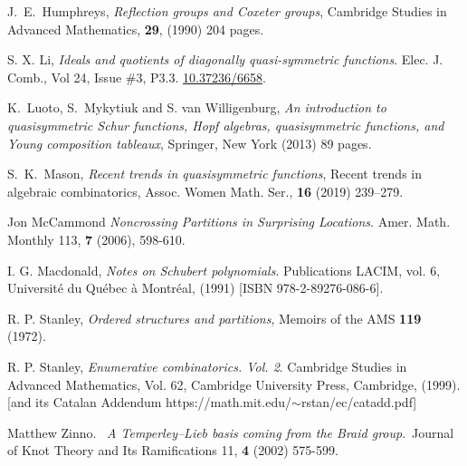 \documentclass[12pt]{amsart}
\theoremstyle{definition}
\theoremstyle{remark}
\numberwithin{equation}{section}
\begin{document}
\begin{thebibliography}{99}
 J.~E.~Humphreys,   \textit{Reflection groups and {C}oxeter groups},
 {Cambridge Studies in Advanced Mathematics},
{\bf 29},
(1990) 204 pages.

 S. X. Li,
\textit{Ideals and quotients of diagonally quasi-symmetric functions}.
Elec. J. Comb., Vol 24, Issue \#3, P3.3.
\href{https://doi.org/10.37236/6658}{10.37236/6658}.

K.~Luoto, S.~Mykytiuk and S. van Willigenburg,
\textit{An introduction to quasisymmetric {S}chur functions, Hopf algebras, quasisymmetric functions, and Young composition
              tableaux},
{Springer, New York}
(2013)
89 pages.
  
 S.~K.~Mason, 
\textit{Recent trends in quasisymmetric functions},
{Recent trends in algebraic combinatorics},
 {Assoc. Women Math. Ser.},
 {\bf 16} (2019) 
{239--279}.
    
 Jon McCammond
\textit{Noncrossing Partitions in Surprising Locations}.
Amer. Math. Monthly 113, {\bf 7} (2006), 598-610.

 I. G. Macdonald,
\textit{Notes on Schubert polynomials}.
Publications LACIM, vol. 6, Universit\'e du Qu\'ebec \`a Montr\'eal,  (1991) [ISBN 978-2-89276-086-6].

  R. P. Stanley, 
\textit{Ordered structures and partitions},
Memoirs of the AMS {\bf 119} (1972).

 R. P.  Stanley,
\textit{Enumerative combinatorics. {V}ol. 2}.
{Cambridge Studies in Advanced Mathematics}, Vol. {62},
{Cambridge University Press, Cambridge}, (1999). [and its {Catalan Addendum} https://math.mit.edu/$\sim$rstan/ec/catadd.pdf]

  Matthew Zinno.  \textit{A Temperley--Lieb basis coming from the Braid group}. Journal of Knot Theory and Its Ramifications 11, {\bf 4} (2002) 575-599.

\end{thebibliography}
\end{document}
